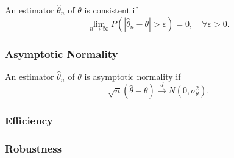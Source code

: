 \begin{definition}[Consistency]
    An estimator $\hat{\theta}_n$ of $\theta$ is consistent if
    \begin{equation}
        \lim_{n\rightarrow\infty}P\left(\left|\hat{\theta}_n-\theta\right|>\varepsilon\right)=0,\quad\forall\varepsilon>0.
    \end{equation}
\end{definition}

\begin{example}

\end{example}

\begin{example}

\end{example}

\subsubsection*{Asymptotic Normality}

\begin{definition}
    An estimator $\hat{\theta}_n$ of $\theta$ is asymptotic normality if
    \begin{equation}
        \sqrt{n}\left(\hat{\theta}-\theta\right)\stackrel{d}{\rightarrow}N\left(0,\sigma_{\theta}^{2}\right).
    \end{equation}
\end{definition}

\subsubsection*{Efficiency}

\begin{definition}[Efficiency]

\end{definition}

\subsubsection*{Robustness}

\begin{definition}[Robustness]

\end{definition}
